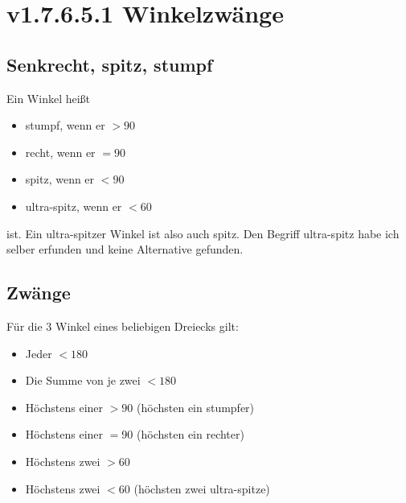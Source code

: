 \documentclass[a4paper]{amsart}
\theoremstyle{definition}
\begin{document}
\section{v1.7.6.5.1 Winkelzwänge}

\subsection{Senkrecht, spitz, stumpf}
Ein Winkel heißt
\begin{itemize}
   \item stumpf, wenn er $> 90$
   \item recht, wenn er $= 90$
   \item spitz, wenn er $< 90$
   \item ultra-spitz, wenn er $< 60$
\end{itemize}
ist. Ein ultra-spitzer Winkel ist also auch spitz. Den Begriff ultra-spitz habe ich selber erfunden und keine Alternative gefunden.

\subsection{Zwänge}
Für die 3 Winkel eines beliebigen Dreiecks gilt:
\begin{itemize}
   \item Jeder $< 180$
   \item Die Summe von je zwei $< 180$
   \item Höchstens einer $> 90$ (höchsten ein stumpfer)
   \item Höchstens einer $= 90$ (höchsten ein rechter)
   \item Höchstens zwei $> 60$
   \item Höchstens zwei $< 60$ (höchsten zwei ultra-spitze)
\end{itemize}
\end{document}
